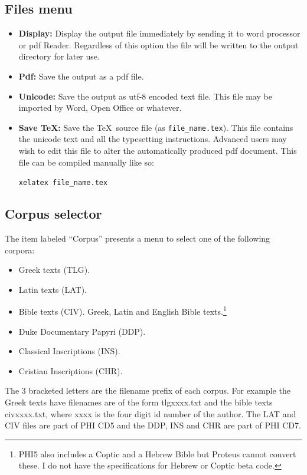 \documentclass[11pt,a4paper]{article}
\begin{document}
  \subsection{Files menu}
    \begin{itemize}
      \item {\bf Display:} Display the output file immediately by sending
      it to word processor or
      pdf Reader. Regardless of this option the file
      will be written to  the output directory for later use.
      \item{\bf Pdf:} Save the output as a pdf file.
      \item{\bf Unicode:} Save the output as utf-8 encoded text file.  This file may be
        imported by Word, Open Office or whatever.
      \item {\bf Save TeX:} Save the \TeX\ source file (as \verb|file_name.tex|).
      This file contains the unicode text and all the typesetting instructions.
      Advanced users may wish to edit this file to alter the automatically
      produced pdf document. This file can be compiled manually like so:
      \begin{center} {\tt xelatex file\_name.tex}\end{center}
    \end{itemize}
  \subsection{Corpus selector}
    The item labeled ``Corpus'' presents a menu to select one
    of the following corpora:
    \begin{itemize}
      \item Greek texts (TLG).
      \item Latin texts (LAT).
      \item Bible texts (CIV).
            Greek, Latin and English Bible texts.\footnote{
                      PHI5 also includes a Coptic
                      and a Hebrew Bible but
                      Proteus cannot convert these. I do not have the specifications
                      for Hebrew or Coptic beta code.                        }
      \item Duke Documentary Papyri (DDP).
      \item Classical Inscriptions (INS).
      \item Cristian  Inscriptions (CHR).
    \end{itemize}
    The 3 bracketed letters are the filename prefix of each corpus. For example the Greek
    texts have filenames are of the form tlgxxxx.txt and the bible texts civxxxx.txt,
    where xxxx is the four digit id number of the author.
    The LAT and CIV files are part of PHI CD5
    and the DDP, INS and CHR are part of PHI CD7.
\end{document}
